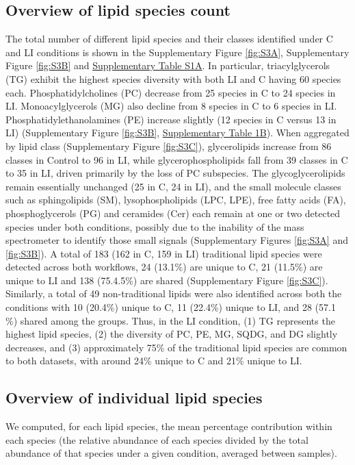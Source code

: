 \documentclass[10pt,letterpaper]{article}
\begin{document}
\subsection*{Overview of lipid species count}
The total number of different lipid species and their classes identified under C and LI conditions is shown in the Supplementary Figure \ref{fig:S3A}, Supplementary Figure \ref{fig:S3B} and  \href{https://docs.google.com/spreadsheets/d/1SB90-QLYheKEzmHCUIh1UfgkrtbL064s8Oo5BfwFaV0/edit?gid=1876149577#gid=1876149577}{Supplementary Table S1A}. In particular, triacylglycerols (TG) exhibit the highest species diversity with both LI and C having 60 species each. Phosphatidylcholines (PC) decrease from 25 species in C to 24 species in LI. Monoacylglycerols (MG) also decline from 8 species in C to 6 species in LI. Phosphatidylethanolamines (PE) increase slightly (12 species in C versus 13 in LI) (Supplementary Figure \ref{fig:S3B}, \href{https://docs.google.com/spreadsheets/d/1SB90-QLYheKEzmHCUIh1UfgkrtbL064s8Oo5BfwFaV0/edit?gid=1876149577#gid=1876149577}{Supplementary Table 1B}). When aggregated by lipid class (Supplementary Figure \ref{fig:S3C}), glycerolipids increase from 86 classes in Control to 96 in LI, while glycerophospholipids fall from 39 classes in C to 35 in LI, driven primarily by the loss of PC subspecies. The glycoglycerolipids remain essentially unchanged (25 in C, 24 in LI), and the small molecule classes such as sphingolipids (SM), lysophospholipids (LPC, LPE), free fatty acids (FA), phosphoglycerols (PG) and ceramides (Cer) each remain at one or two detected species under both conditions, possibly due to the inability of the mass spectrometer to identify those small signals (Supplementary Figures \ref{fig:S3A} and \ref{fig:S3B}). A total of 183 (162 in C, 159 in LI) traditional lipid species were detected across both workflows, 24 (13.1\%) are unique to C, 21 (11.5\%) are unique to LI and 138 (75.4.5\%) are shared (Supplementary Figure \ref{fig:S3C}). Similarly, a total of 49 non-traditional lipids were also identified across both the conditions with 10 (20.4\%) unique to C, 11 (22.4\%) unique to LI, and 28 (57.1 \%) shared among the groups. Thus, in the LI condition, (1) TG represents the highest lipid species, (2) the diversity of PC, PE, MG, SQDG, and DG slightly decreases, and (3) approximately 75\% of the traditional lipid species are common to both datasets, with around 24\% unique to C and 21\% unique to LI.


\subsection*{Overview of individual lipid species}
We computed, for each lipid species, the mean percentage contribution within each species (the relative abundance of each species divided by the total abundance of that species under a given condition, averaged between samples). 
\end{document}
